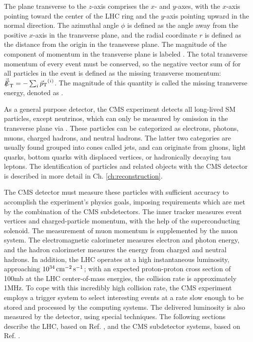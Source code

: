 The plane transverse to the $z$-axis comprises the $x$- and $y$-axes, with the $x$-axis pointing toward the center of the LHC ring and the $y$-axis pointing upward in the normal direction. The azimuthal angle $\phi$ is defined as the angle away from the positive $x$-axis in the transverse plane, and the radial coordinate $r$ is defined as the distance from the origin in the transverse plane. The magnitude of the component of momentum in the transverse plane is labeled \pt. The total transverse momentum of every event must be conserved, so the negative vector sum of \vecpt for all particles in the event is defined as the missing transverse momentum: $\vecmet = - \sum_{i} \vecpt^{(i)}$. The magnitude of this quantity is called the missing transverse energy, denoted as \met.

As a general purpose detector, the CMS experiment detects all long-lived SM particles, except neutrinos, which can only be measured by omission in the transverse plane via \met. These particles can be categorized as electrons, photons, muons, charged hadrons, and neutral hadrons. The latter two categories are usually found grouped into cones called jets, and can originate from gluons, light quarks, bottom quarks with displaced vertices, or hadronically decaying tau leptons. The identification of particles and related objects with the CMS detector is described in more detail in Ch. \ref{ch:reconstruction}.

The CMS detector must measure these particles with sufficient accuracy to accomplish the experiment's physics goals, imposing requirements which are met by the combination of the CMS subdetectors. The inner tracker measures event vertices and charged-particle momentum, with the help of the superconducting solenoid. The measurement of muon momentum is supplemented by the muon system. The electromagnetic calorimeter measures electron and photon energy, and the hadron calorimeter measures the energy from charged and neutral hadrons. In addition, the LHC operates at a high instantaneous luminosity, approaching $10^{34}\,\text{cm}^\text{$-$2}\,\text{s}^\text{$-$1}$; with an expected proton-proton cross section of 100\unit{mb} at the LHC center-of-mass energies, the collision rate is approximately 1\unit{MHz}. To cope with this incredibly high collision rate, the CMS experiment employs a trigger system to select interesting events at a rate slow enough to be stored and processed by the computing systems. The delivered luminosity is also measured by the detector, using special techniques. The following sections describe the LHC, based on Ref. \cite{LHCmachine}, and the CMS subdetector systems, based on Ref. \cite{CMSJINST}.

